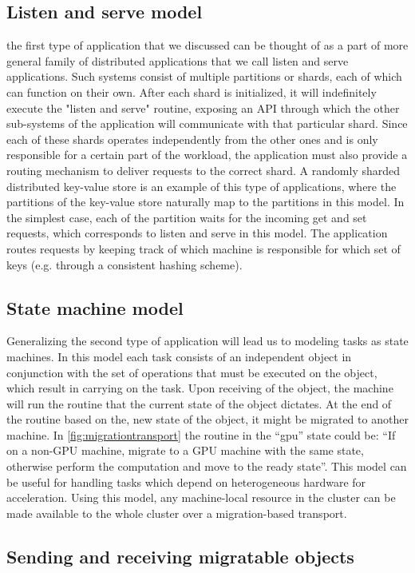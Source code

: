 \subsection{Listen and serve model}
the first type of application that we discussed can be thought of as a
part of more general family of distributed applications that we call
listen and serve applications.
Such systems consist of multiple partitions or shards, each
of which can function on their own. After each shard is initialized, it
will indefinitely execute the "listen and serve" routine,
exposing an API through which the other sub-systems of the application
will communicate with that particular shard. Since each of these shards
operates independently from the other ones and is only
responsible for a certain part of the workload, the application
must also provide a routing mechanism to
deliver requests to the correct shard. A randomly sharded distributed
key-value store is an example of this type of applications, where the
partitions of the key-value store naturally map to the partitions in this
model. In the simplest case, each of the partition waits for the incoming
get and set requests, which corresponds to listen and serve in this model.
The application routes requests by keeping track of which machine
is responsible for which set of keys (e.g. through a consistent hashing
scheme).

\subsection{State machine model}
Generalizing the second type of application will lead us to modeling
tasks as state machines. In this model each task consists of an
independent object in conjunction with the set of operations that must be
executed on the object, which result in carrying on the task. Upon
receiving of the object, the machine will run the routine that the current
state of the object dictates. At the end of the routine based on the, new
state of the object, it might be migrated to another machine. In
\autoref{fig:migrationtransport} the routine in the ``gpu'' state could be:
``If on a non-GPU machine, migrate to a GPU machine with the same state,
otherwise perform the computation and move to the ready state''. This
model can be useful for handling tasks which depend on heterogeneous
hardware for acceleration. Using this model, any machine-local
resource in the cluster can be made available to the whole cluster over
a migration-based transport.


\subsection{Sending and receiving migratable objects}
\label{subsec:sendrecmig}

